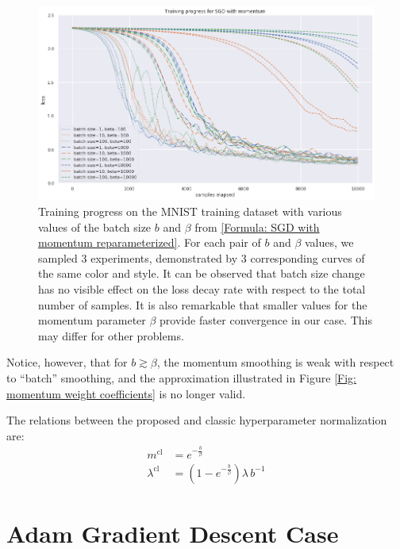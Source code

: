 \documentclass[12pt,a4paper]{amsart}
\numberwithin{equation}{section}
\theoremstyle{remark}
\begin{document}
\begin{figure}
	\centering
	\includegraphics[width=16cm,keepaspectratio=true]{images/batch_size_and_momentum.png}
	\caption{
		Training progress on the MNIST training dataset with various values of the batch size
		$b$
		and
		$\beta$
		from
		\eqref{Formula: SGD with momentum reparameterized}.
		For each pair of
		$b$ and
		$\beta$
		values,
		we sampled 3 experiments,
		demonstrated by 3 corresponding curves of the same color and style.
		It can be observed that batch size change has no visible effect on the loss decay rate with respect to the total number of samples. It is also remarkable that smaller values for the momentum parameter $\beta$ provide faster convergence in our case. This may differ for other problems.
	}
	\label{Fig: batch size and momentum}
\end{figure}

Notice, however, that for
$b \gtrsim \beta$,
the momentum smoothing is weak with respect to ``batch'' smoothing,
and the approximation illustrated in Figure
\ref{Fig: momentum weight coefficients}
is no longer valid.

The relations between the proposed and classic hyperparameter normalization are:
\[\begin{aligned}
	m^{\text{cl}} &= e^{-\frac{b}{\beta}} \\
	\lambda^{\text{cl}} &= \left(1 - e^{-\frac{b}{\beta}} \right) \lambda\, b^{-1}
\end{aligned}\]


\section{Adam Gradient Descent Case}
\end{document}

